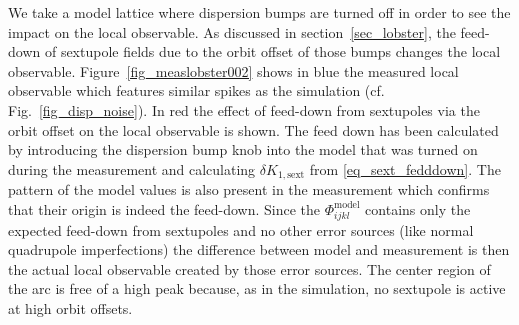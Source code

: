 We take a model lattice where dispersion bumps are turned off in order to see the impact on the 
local observable.
As discussed in section~\ref{sec_lobster}, the feed-down of sextupole fields due to the orbit offset
of those bumps changes the local observable.
Figure~\ref{fig_measlobster002} shows in blue the measured local observable which features similar
spikes as the simulation (cf. Fig.~\ref{fig_disp_noise}).
In red the effect of feed-down from sextupoles via the orbit offset on the local observable is shown.
The feed down has been calculated by introducing the dispersion bump knob into the model that was turned
on during the measurement and calculating $\delta K_{1, \text{sext}}$ from \eqref{eq_sext_fedddown}.
The pattern of the model
values is also present in the measurement which confirms that their origin is indeed the feed-down.
Since the $\Phi_{ijkl}^\text{model}$ contains only the expected feed-down from sextupoles and no other
error sources (like normal quadrupole imperfections) the difference between model and measurement is
then the actual local observable created by those error sources.
The center region of the arc is free of a high peak because, as in the simulation, no sextupole is 
active at high orbit offsets.
